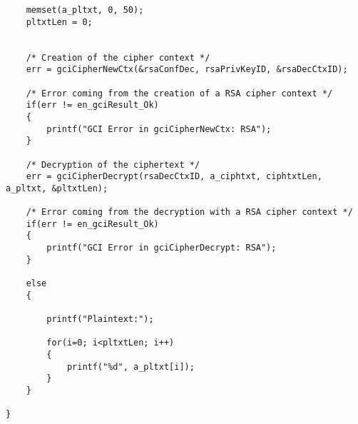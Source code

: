 \begin{lstlisting}
    memset(a_pltxt, 0, 50);
    pltxtLen = 0;


    /* Creation of the cipher context */
    err = gciCipherNewCtx(&rsaConfDec, rsaPrivKeyID, &rsaDecCtxID);

    /* Error coming from the creation of a RSA cipher context */
    if(err != en_gciResult_Ok)
    {
        printf("GCI Error in gciCipherNewCtx: RSA");
    }

    /* Decryption of the ciphertext */
    err = gciCipherDecrypt(rsaDecCtxID, a_ciphtxt, ciphtxtLen, a_pltxt, &pltxtLen);

    /* Error coming from the decryption with a RSA cipher context */
    if(err != en_gciResult_Ok)
    {
        printf("GCI Error in gciCipherDecrypt: RSA");
    }

    else
    {

        printf("Plaintext:");

        for(i=0; i<pltxtLen; i++)
        {
            printf("%d", a_pltxt[i]);
        }
    }

}
\end{lstlisting}
